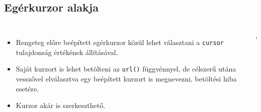 \subsection{Egérkurzor alakja}

\begin{frame}
  \begin{columns}[c]
      \begin{itemize}
        \item Rengeteg előre beépített egérkurzor közül lehet választani a \texttt{cursor} tulajdonság értékének állításával.
        \item Saját kurzort is lehet betölteni az \texttt{url()} függvénnyel, de célszerű utána vesszővel elválasztva egy beépített kurzort is megnevezni, betöltési hiba esetére.
        \item Kurzor akár  is szerkeszthető.
      \end{itemize}
      \begin{exampleblock}{, }

\end{exampleblock}
\end{columns}
\end{frame}
